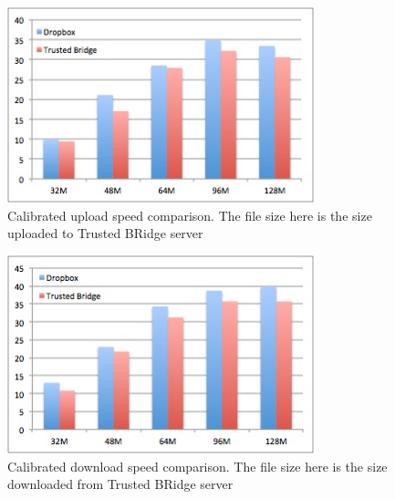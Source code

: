\begin{figure}[ht]
\centering
\includegraphics[width=3.5in]{pics/upload_bar.png}
\caption{Calibrated upload speed comparison. The file size here is the size uploaded to Trusted BRidge server}
\label{fig:upload_bar}
\end{figure}

\begin{figure}[ht]
\centering
\includegraphics[width=3.5in]{pics/download_bar.png}
\caption{Calibrated download speed comparison. The file size here is the size downloaded from Trusted BRidge server}
\label{fig:download_bar}
\end{figure}